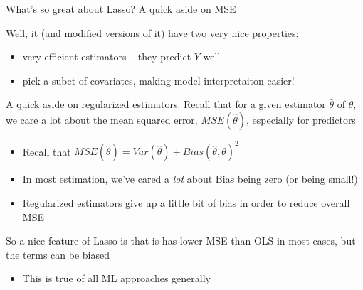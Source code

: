 \documentclass[notes,11pt, aspectratio=169]{beamer}
\newenvironment{wideitemize}{\itemize\addtolength{\itemsep}{10pt}}{\enditemize}
\begin{document}
\begin{frame}{What's so great about Lasso? A quick aside on MSE}
  \begin{wideitemize}
  \item Well, it (and modified versions of it) have two very nice properties:
    \begin{itemize}
    \item very efficient estimators -- they predict $Y$ well
    \item pick a subet of covariates, making model interpretaiton easier! 
    \end{itemize}
  \item A quick aside on regularized estimators. Recall that for a
    given estimator $\hat{\theta}$ of $\theta$, we care a lot about
    the mean squared error, $MSE(\hat{\theta})$, especially for predictors
    \begin{itemize}
    \item Recall that  $MSE(\hat{\theta}) = Var(\hat{\theta}) + Bias(\hat{\theta}, \theta)^{2}$
    \item In most estimation, we've cared a \emph{lot} about Bias being zero (or being small!)
    \item Regularized estimators give up a little bit of bias in order
      to reduce overall MSE
    \end{itemize}
  \item So a nice feature of Lasso is that is has lower MSE than OLS
    in most cases, but the terms can be biased
    \begin{itemize}
    \item This is true of all ML approaches generally
    \end{itemize}
  \end{wideitemize}
\end{frame}
\end{document}
